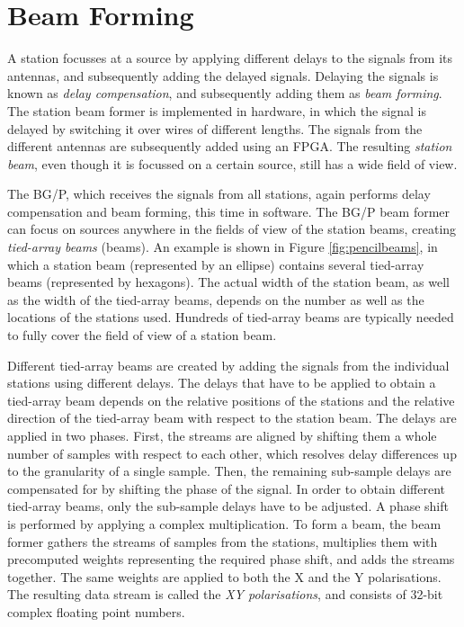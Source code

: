 \documentclass{llncs}
\begin{document}

\section{Beam Forming}
\label{Sec:Beamforming}

A station focusses at a source by applying different delays to the signals from its antennas, and subsequently adding the delayed signals. Delaying the signals is known as \emph{delay compensation}, and subsequently adding them as \emph{beam forming}. The station beam former is implemented in hardware, in which the signal is delayed by switching it over wires of different lengths. The signals from the different antennas are subsequently added using an FPGA. The resulting \emph{station beam}, even though it is focussed on a certain source, still has a wide field of view.

The BG/P, which receives the signals from all stations, again performs delay compensation and beam forming, this time in software. The BG/P beam former can focus on sources anywhere in the fields of view of the station beams, creating \emph{tied-array beams} (beams). An example is shown in Figure \ref{fig:pencilbeams}, in which a station beam (represented by an ellipse) contains several tied-array beams (represented by hexagons). The actual width of the station beam, as well as the width of the tied-array beams, depends on the number as well as the locations of the stations used. Hundreds of tied-array beams are typically needed to fully cover the field of view of a station beam.

Different tied-array beams are created by adding the signals from the individual stations using different delays. The delays that have to be applied to obtain a tied-array beam depends on the relative positions of the stations and the relative direction of the tied-array beam with respect to the station beam. The delays are applied in two phases. First, the streams are aligned by shifting them a whole number of samples with respect to each other, which resolves delay differences up to the granularity of a single sample. Then, the remaining sub-sample delays are compensated for by shifting the phase of the signal. In order to obtain different tied-array beams, only the sub-sample delays have to be adjusted. A phase shift is performed by applying a complex multiplication. To form a beam, the beam former gathers the streams of samples from the stations, multiplies them with precomputed weights representing the required phase shift, and adds the streams together. The same weights are applied to both the X and the Y polarisations. The resulting data stream is called the \emph{XY polarisations}, and consists of 32-bit complex floating point numbers.
\end{document}
